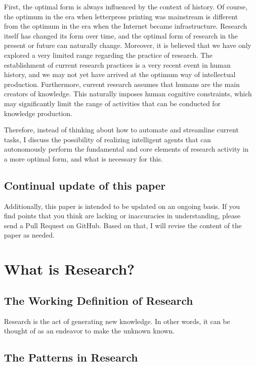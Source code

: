 \documentclass{book}
\begin{document}
First, the optimal form is always influenced by the context of history. Of course, the optimum in the era when letterpress printing was mainstream is different from the optimum in the era when the Internet became infrastructure. Research itself has changed its form over time, and the optimal form of research in the present or future can naturally change. Moreover, it is believed that we have only explored a very limited range regarding the practice of research. The establishment of current research practices is a very recent event in human history, and we may not yet have arrived at the optimum way of intellectual production. Furthermore, current research assumes that humans are the main creators of knowledge. This naturally imposes human cognitive constraints, which may significantly limit the range of activities that can be conducted for knowledge production. 

Therefore, instead of thinking about how to automate and streamline current tasks, I discuss the possibility of realizing intelligent agents that can autonomously perform the fundamental and core elements of research activity in a more optimal form, and what is necessary for this.

\section{Continual update of this paper}

Additionally, this paper is intended to be updated on an ongoing basis. If you find points that you think are lacking or inaccuracies in understanding, please send a Pull Request on GitHub. Based on that, I will revise the content of the paper as needed.


\chapter{What is Research?}

\section{The Working Definition of Research}
Research is the act of generating new knowledge. In other words, it can be thought of as an endeavor to make the unknown known.

\section{The Patterns in Research}
\end{document}
